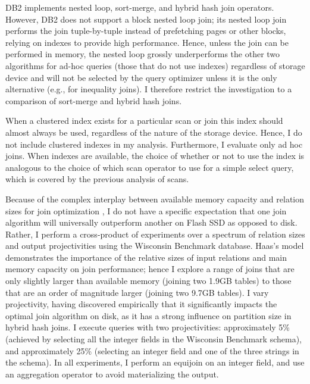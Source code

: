 DB2 implements nested loop, sort-merge, and hybrid hash join operators.  
However, DB2 does not support a block nested loop join; its nested loop join performs the join tuple-by-tuple instead of prefetching pages or other blocks, relying on indexes to provide high performance.
Hence, unless the join can be performed in memory, the nested loop grossly underperforms the other two algorithms for ad-hoc queries (those that do not use indexes) regardless of storage device and will not be selected by the query optimizer unless it is the only alternative (e.g., for inequality joins). 
I therefore restrict the investigation to a comparison of sort-merge and hybrid hash joins.

When a clustered index exists for a particular scan or join this index should almost always be used, regardless of the nature of the storage device.  
Hence, I do not include clustered indexes in my analysis.
Furthermore, I evaluate only ad hoc joins.
When indexes are available, the choice of whether or not to use the index is analogous to the choice of which scan operator to use for a simple select query, which is covered by the previous analysis of scans.

Because of the complex interplay between available memory capacity and relation sizes for join optimization \cite{DBLP:journals/vldb/HaasCLS97}, I do not have a specific expectation that one join algorithm will universally outperform another on Flash SSD as opposed to disk.
Rather, I perform a cross-product of experiments over a spectrum of relation sizes and output projectivities using the Wisconsin Benchmark database.  
Haas's model demonstrates the importance of the relative sizes of input relations and main memory capacity on join performance; hence I explore a range of joins that are only slightly larger than available memory (joining two 1.9GB tables) to those that are an order of magnitude larger (joining two 9.7GB tables).   
I vary projectivity, having discovered empirically that it significantly impacts the optimal join algorithm on disk, as it has a strong influence on partition size in hybrid hash joins.
I execute queries with two projectivities: approximately 5\% (achieved by selecting all the integer fields in the Wisconsin Benchmark schema), and approximately 25\% (selecting an integer field and one of the three strings in the schema).
In all experiments, I perform an equijoin on an integer field, and use an aggregation operator to avoid materializing the output.



